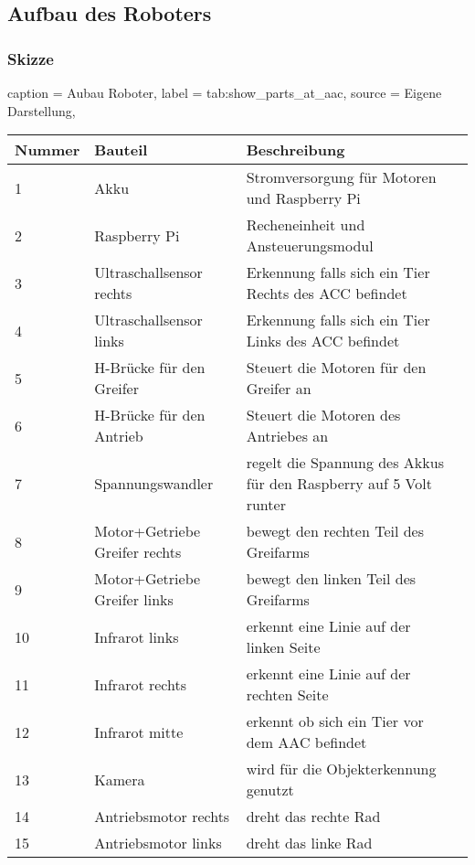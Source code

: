 \subsection{Aufbau des Roboters}


\subsubsection{Skizze}


\begin{dhbwtable}{%
    caption	= Aubau Roboter,
    label	= tab:show_parts_at_aac,
    source	= Eigene Darstellung,
}
    \begin{tabular}{llll}
        \toprule
        \textbf{Nummer}     & \textbf{Bauteil}      &\textbf{Beschreibung}   \\\midrule
        1   	            & Akku                  & Stromversorgung für Motoren und Raspberry Pi\\
        2                   & Raspberry Pi          & Recheneinheit und Ansteuerungsmodul \\
        3                   & Ultraschallsensor rechts   & Erkennung falls sich ein Tier Rechts des ACC befindet  \\
        4                   & Ultraschallsensor links   & Erkennung falls sich ein Tier Links des ACC befindet  \\
        5                   & H-Brücke für den Greifer   & Steuert die Motoren für den Greifer an   \\
        6                   & H-Brücke für den Antrieb   & Steuert die Motoren des Antriebes an   \\
        7                   & Spannungswandler   & regelt die Spannung des Akkus für den Raspberry auf 5 Volt runter  \\
        8                   & Motor+Getriebe Greifer rechts   & bewegt den rechten Teil des Greifarms  \\
        9                   & Motor+Getriebe Greifer links   & bewegt den linken Teil des Greifarms  \\
        10                  & Infrarot links   & erkennt eine Linie auf der linken Seite  \\
        11                  & Infrarot rechts   & erkennt eine Linie auf der rechten Seite  \\
        12                  & Infrarot mitte   & erkennt ob sich ein Tier vor dem AAC befindet  \\
        13                  & Kamera   & wird für die Objekterkennung genutzt  \\
        14                  & Antriebsmotor rechts   & dreht das rechte Rad  \\
        15                  & Antriebsmotor links   & dreht das linke Rad  \\


\end{tabular}
\end{dhbwtable}
